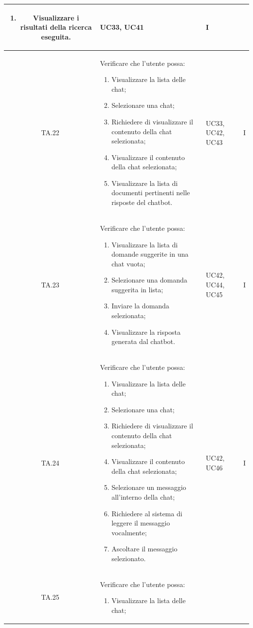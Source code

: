 \begin{xltabular}{\textwidth}{|c|X|p{2.5cm}|c|}
\begin{enumerate}
    \item Visualizzare i risultati della ricerca eseguita.
\end{enumerate}
& UC33, UC41 & I \\
\hline
TA.22 & Verificare che l'utente possa:
\begin{enumerate}
    \item Visualizzare la lista delle chat;
    \item Selezionare una chat;
    \item Richiedere di visualizzare il contenuto della chat selezionata;
    \item Visualizzare il contenuto della chat selezionata;
    \item Visualizzare la lista di documenti pertinenti nelle risposte del chatbot.
\end{enumerate}
& UC33, UC42, UC43 & I \\
\hline
TA.23 & Verificare che l'utente possa:
\begin{enumerate}
    \item Visualizzare la lista di domande suggerite in una chat vuota;
    \item Selezionare una domanda suggerita in lista;
    \item Inviare la domanda selezionata;
    \item Visualizzare la risposta generata dal chatbot.
\end{enumerate}
& UC42, UC44, UC45 & I \\
\hline
TA.24 & Verificare che l'utente possa:
\begin{enumerate}
    \item Visualizzare la lista delle chat;
    \item Selezionare una chat;
    \item Richiedere di visualizzare il contenuto della chat selezionata;
    \item Visualizzare il contenuto della chat selezionata;
    \item Selezionare un messaggio all'interno della chat;
    \item Richiedere al sistema di leggere il messaggio vocalmente;
    \item Ascoltare il messaggio selezionato.
\end{enumerate}
& UC42, UC46 & I \\
\hline
TA.25 & Verificare che l'utente possa:
\begin{enumerate}
    \item Visualizzare la lista delle chat;

\end{enumerate}
\end{xltabular}
